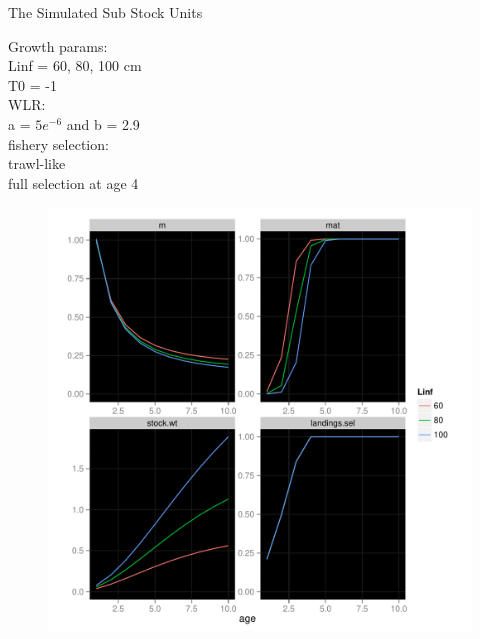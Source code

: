 \documentclass{beamer}
\begin{document}
\begin{withoutheadline}
\begin{frame}{The Simulated Sub Stock Units}
  \begin{minipage}{.3\textwidth}
   Growth params:\\
   Linf = 60, 80, 100 cm \\
   T0 = -1 \\
   
   \vspace{.25cm}
   WLR:\\ a = $5e^{-6}$ and b = 2.9 \\

   \vspace{.25cm}   
   fishery selection:\\ trawl-like \\
   full selection at age 4  
  \end{minipage}
  \hspace{0.25cm}  
  \begin{minipage}{.65\textwidth}
  \begin{figure}
  \flushleft
  \includegraphics[width=\textwidth]{LH-choices1}
  \end{figure}
  \end{minipage}
\end{frame}
\end{withoutheadline}
\end{document}
